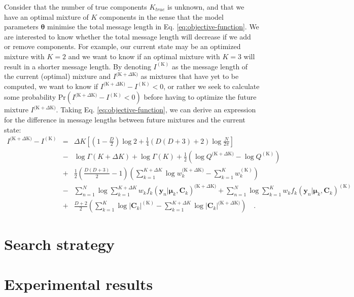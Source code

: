 \documentclass{article}
\newcommand{\vect}[1]{\boldsymbol{\mathbf{#1}}}
\def\veccov{\vect{C}}
\def\vecmean{\vect{\mu}}
\def\vectheta{\vect{\theta}}
\def\weight{w}
\def\datum{y}
\def\data{\vect{\datum}}
\def\current{^{\mathrm{(K)}}}
\def\future{^{\mathrm{(K} + \Delta\mathrm{K)}}}
\begin{document}
Consider that the number of true components $K_{true}$ is unknown, and that we
have an optimal mixture of $K$ components in the sense that the model
parameters $\vectheta$ minimise the total message length in Eq.
\ref{eq:objective-function}.  We are interested to know whether the total
message length will decrease if we add or remove components.  For
example, our current state may be an optimized mixture with $K=2$ and we want
to know if an optimal mixture with $K=3$ will result in a shorter message
length.  By denoting $I\current$ as the message length of the current (optimal) 
mixture and $I\future$ as mixtures that have yet to be computed, we
want to know if $I\future - I\current < 0$, or rather we seek to calculate 
some probability $\textrm{Pr}(I\future - I\current < 0)$ before having to 
optimize the future mixture $I\future$.  
Taking Eq. \ref{eq:objective-function}, we can derive an expression for the 
difference in message lengths between future mixtures and the current state:
\begin{eqnarray}
  I\future - I\current &=& \Delta{K}\left[
  \left(1 - \frac{D}{2}\right)\log{2} + \frac{1}{4}\left(D(D+3)+2\right)\log\frac{N}{2\pi}\right] \nonumber \\
  &-& \log\Gamma(K+\Delta{K}) + \log\Gamma(K) + \frac{1}{2}\left(\log{Q\future} - \log{Q\current}\right) \nonumber \\
  &+& \frac{1}{2}\left(\frac{D(D+3)}{2} - 1\right)\left(\sum_{k=1}^{K+\Delta{K}}\log\weight_k\future - \sum_{k=1}^{K}\weight_k\current\right) \nonumber \\
  &-& \sum_{n=1}^{N}\log\sum_{k=1}^{K+\Delta{K}}\weight_{k}f_{k}(\data_n|\vecmean_k,\veccov_k)\future + \sum_{n=1}^{N}\log\sum_{k=1}^{K}\weight_{k}f_{k}(\data_n|\vecmean_k,\veccov_k)\current \nonumber \\
  &+& \frac{D + 2}{2}\left(\sum_{k=1}^{K}\log|\veccov_k|\current - \sum_{k=1}^{K + \Delta{K}}\log|\veccov_k|\future\right) \quad .
\end{eqnarray}




\section{Search strategy}




\section{Experimental results}
\end{document}
